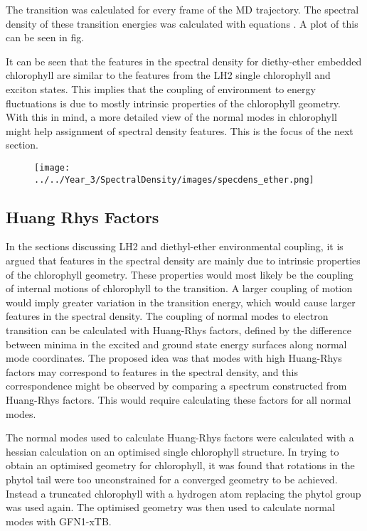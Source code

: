 The \Qy transition was calculated for every frame of the MD trajectory. The spectral
density of these transition energies was calculated with equations . A plot of this 
can be seen in fig.

It can be seen that the features in the spectral density for diethy-ether embedded
chlorophyll are similar to the features from the LH2 single chlorophyll and exciton
states. This implies that the coupling of environment to energy fluctuations is 
due to mostly intrinsic properties of the chlorophyll geometry. With this in mind,
a more detailed view of the normal modes in chlorophyll might help assignment of
spectral density features. This is the focus of the next section.

\begin{figure}
    \centering
    \texttt{[image: ../../Year\_3/SpectralDensity/images/specdens\_ether.png]}
\end{figure}

\subsection{Huang Rhys Factors}
\label{subsec:hrf}

In the sections discussing LH2 and diethyl-ether environmental coupling, it is argued
that features in the spectral density are mainly due to intrinsic properties of 
the chlorophyll geometry. These properties would most likely be the coupling of
internal motions of chlorophyll to the \Qy transition. A larger coupling of motion
would imply greater variation in the \Qy transition energy, which would cause larger 
features in the spectral density. The coupling of normal modes to electron transition
can be calculated with Huang-Rhys factors, defined by the difference between minima
in the excited and ground state energy surfaces along normal mode coordinates. The
proposed idea was that modes with high Huang-Rhys factors may correspond to features
in the spectral density, and this correspondence might be observed by comparing a
spectrum constructed from Huang-Rhys factors. This would require calculating these
factors for all normal modes.

The normal modes used to calculate Huang-Rhys factors were calculated with a hessian
calculation on an optimised single chlorophyll structure. In trying to obtain an
optimised geometry for chlorophyll, it was found that rotations in the phytol tail 
were too unconstrained for a converged geometry to be achieved. Instead a truncated
chlorophyll with a hydrogen atom replacing the phytol group was used again. The 
optimised geometry was then used to calculate normal modes with GFN1-xTB.


